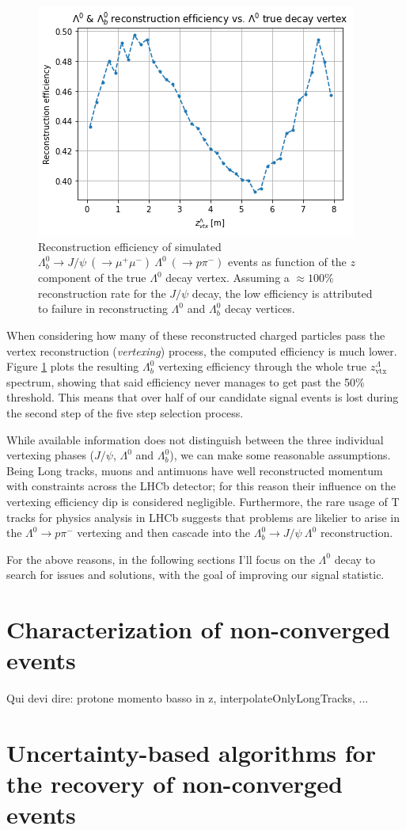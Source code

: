 \begin{figure}[t!]
	\centering
	\includegraphics[width=.6\textwidth]{graphics/03-vertex_reconstruction/lambda_lambdab_reco_efficiency.png}
	\caption[A]{Reconstruction efficiency of simulated $\Lambda^0_b \rightarrow J/\psi~(\rightarrow \mu^+\mu^-)~\Lambda^0~(\rightarrow p\pi^-)$ events as function of the $z$ component of the true $\Lambda^0$ decay vertex. Assuming a $\approx 100\%$ reconstruction rate for the $J/\psi$ decay, the low efficiency is attributed to failure in reconstructing $\Lambda^0$ and $\Lambda^0_b$ decay vertices.}
	\label{fig:lambda_lambdab_reco_efficiency}
\end{figure}

When considering how many of these reconstructed charged particles pass the vertex reconstruction (\textit{vertexing}) process, the computed efficiency is much lower.
Figure \ref{fig:lambda_lambdab_reco_efficiency} plots the resulting $\Lambda_b^0$ vertexing efficiency through the whole true $z_\text{vtx}^\Lambda$ spectrum, showing that said efficiency never manages to get past the 50\% threshold.
This means that over half of our candidate signal events is lost during the second step of the five step selection process.

While available information does not distinguish between the three individual vertexing phases ($J/\psi$, $\Lambda^0$ and $\Lambda_b^0$), we can make some reasonable assumptions.
Being Long tracks, muons and antimuons have well reconstructed momentum with constraints across the LHCb detector;
for this reason their influence on the vertexing efficiency dip is considered negligible.
Furthermore, the rare usage of T tracks for physics analysis in LHCb suggests that problems are likelier to arise in the $\Lambda^0 \rightarrow p\pi^-$ vertexing and then cascade into the $\Lambda_b^0 \rightarrow J/\psi~\Lambda^0$ reconstruction.

For the above reasons, in the following sections I'll focus on the $\Lambda^0$ decay to search for issues and solutions, with the goal of improving our signal statistic. %


\section{Characterization of non-converged events}
Qui devi dire: protone momento basso in z, interpolateOnlyLongTracks, ...

\section{Uncertainty-based algorithms for the recovery of non-converged events}
